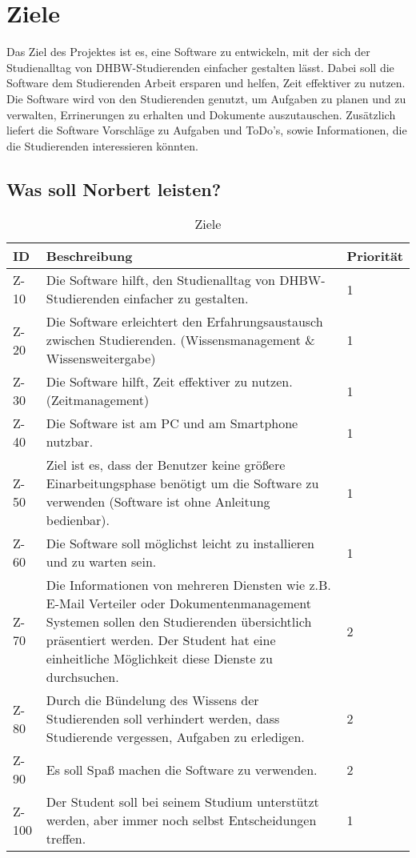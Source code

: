 
\chapter{Ziele}
Das Ziel des Projektes ist es, eine Software zu entwickeln, mit der sich der Studienalltag von DHBW-Studierenden einfacher gestalten lässt. Dabei soll die Software dem Studierenden Arbeit ersparen und helfen, Zeit effektiver zu nutzen. Die Software wird von den Studierenden genutzt, um  Aufgaben zu planen und zu verwalten, Errinerungen zu erhalten und Dokumente auszutauschen. Zusätzlich liefert die Software Vorschläge zu Aufgaben und ToDo's, sowie Informationen, die die Studierenden interessieren könnten. 

\section{Was soll Norbert leisten?}
\begin{table}[H]
\caption{Ziele}
\label{ziele:entwicklungsziele}
\begin{tabularx}{\textwidth}{|l|X|l|}
\toprule
\textbf{ID} & \textbf{Beschreibung} & \textbf{Priorität}\\
\endhead
\hline
Z-10 & Die Software hilft, den Studienalltag von DHBW-Studierenden einfacher zu gestalten. & 1 \\
Z-20 & Die Software erleichtert den Erfahrungsaustausch zwischen Studierenden. (Wissensmanagement \& Wissensweitergabe) & 1 \\
Z-30 & Die Software hilft, Zeit effektiver zu nutzen. (Zeitmanagement) & 1\\
Z-40 & Die Software ist am PC und am Smartphone nutzbar. & 1\\
Z-50 & Ziel ist es, dass der Benutzer keine größere Einarbeitungsphase benötigt um die Software zu verwenden (Software ist ohne Anleitung bedienbar). & 1 \\
Z-60 & Die Software soll möglichst leicht zu installieren und zu warten sein. & 1 \\
Z-70 & Die Informationen von mehreren Diensten wie z.B. E-Mail Verteiler oder Dokumentenmanagement Systemen sollen den Studierenden übersichtlich präsentiert werden. Der Student hat eine einheitliche Möglichkeit diese Dienste zu durchsuchen. & 2 \\
Z-80 & Durch die Bündelung des Wissens der Studierenden soll verhindert werden, dass Studierende vergessen, Aufgaben zu erledigen. & 2 \\
Z-90 & Es soll Spaß machen die Software zu verwenden. & 2 \\
Z-100 & Der Student soll bei seinem Studium unterstützt werden, aber immer noch selbst Entscheidungen treffen. & 1 \\
\hline
\end{tabularx}
\end{table}

